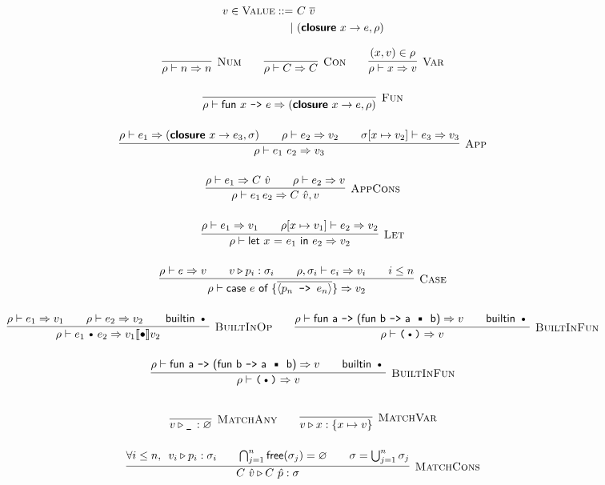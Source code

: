 \documentclass{article}
\def\code#1{\textsf{#1}}
\def\por{\ | \ }
\def\rt{\Rightarrow}
\def\binop{\, \text{\textbullet}\, }
\def\envj#1#2#3{#1 \vdash #2 \rt #3}
\def\closure#1#2#3{(\textsf{\textbf{closure}} \ #1 \to #2,#3)}
\def\tsc#1{\textsc{#1}}
\def\matchj#1#2#3{#1 \triangleright #2 : #3}
\begin{document}
\begin{align*}
v\in \textsc{Value}::=\ & C \ \overline{v} \\
\por & \closure x e \rho
\end{align*}
\pagebreak

\begin{gather*}
\infer[\tsc{Num}]{\envj \rho n n}{}\qquad
\infer[\tsc{Con}]{\envj \rho C C}{}\qquad
\infer[\tsc{Var}]{\envj \rho x v}{(x,v)\in \rho}\\[12pt]
\infer[\tsc{Fun}]{\envj \rho {\code{fun $x$ \texttt{->} $e$}} {\closure x e \rho}}{}\\[12pt]
\infer[\tsc{App}]{\envj \rho {e_1 \ e_2} v_3}{\envj{\rho}{e_1}{\closure x {e_3} {\sigma}} && \envj \rho {e_2} {v_2} && \envj{\sigma [x\mapsto v_2]}{e_3}{v_3}}\\[12pt]
\infer[\tsc{AppCons}]{\envj{\rho}{e_1\, e_2}{C\ \hat{v},v}}{\envj{\rho}{e_1}{C\ \hat{v}} && \envj{\rho}{e_2}{v}}\\[12pt]
\infer[\tsc{Let}]{\envj \rho {\code{let $x$ = $e_1$ in $e_2$}} {v_2}}{\envj \rho {e_1} {v_1} && \envj {\rho[x\mapsto v_1]} {e_2} {v_2}}\\[12pt]
\infer[\tsc{Case}]{\envj \rho {\code{case $e$ of \{$\overline{\langle p_n \texttt{ -> } e_n\rangle}$\}}} {v_2}}{\envj \rho {e} {v} && v\triangleright p_i : \sigma_i && \envj {\rho,\sigma_i}{e_i}{v_i} && i \leq n}\\[12pt]
\infer[\tsc{BuiltInOp}]{\envj \rho {e_1 \binop e_2} {v_1\llbracket\bullet \rrbracket v_2}}{\envj \rho {e_1} {v_1} && \envj {\rho} {e_2} {v_2} && \textsf{builtin}\, \binop}\qquad
\infer[\tsc{BuiltInFun}]{\envj \rho {\texttt{($\binop$)}} {v}}{\envj \rho {\code{fun a \texttt{->} (fun b \texttt{->} a $\binop$ b)}} {v} && \textsf{builtin}\, \binop}\\[12pt]
\infer[\tsc{BuiltInFun}]{\envj \rho {\texttt{($\binop$)}} {v}}{\envj \rho {\code{fun a \texttt{->} (fun b \texttt{->} a $\binop$ b)}} {v} && \textsf{builtin}\, \binop}\\[12pt]
\end{gather*}

\begin{gather*}
\infer[\tsc{MatchAny}]{\matchj v {\texttt{\_}\,} \varnothing}{}\qquad
\infer[\tsc{MatchVar}]{\matchj v x {\{x\mapsto v\}}}{}\\[12pt]
\infer[\tsc{MatchCons}]{\matchj {C\ \hat{v}} {C\ \hat{p}} \sigma}{\forall i \leq n,\ \, \matchj{v_i}{p_i}{\sigma_i} && \bigcap_{j=1}^n \textsf{free}(\sigma_j)=\varnothing && \sigma = \bigcup_{j=1}^n \sigma_j}	
\end{gather*}
\end{document}
